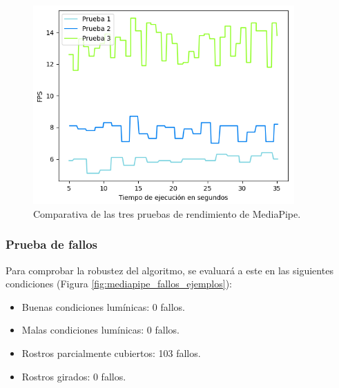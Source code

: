 \begin{figure} [h!]
  \begin{center}
    \includegraphics[width=10cm]{figs/mediapipe_rendimiento.png}
  \end{center}
  \captionsetup{justification=centering}
  \caption{Comparativa de las tres pruebas de rendimiento de MediaPipe.}
  \label{fig:mediapipe_rendimiento}
\end{figure}

\subsubsection{Prueba de fallos}

Para comprobar la robustez del algoritmo, se evaluará a este en las siguientes condiciones (Figura \ref{fig:mediapipe_fallos_ejemplos}):

\begin{itemize}
    \item Buenas condiciones lumínicas: 0 fallos.
    \item Malas condiciones lumínicas: 0 fallos.
    \item Rostros parcialmente cubiertos: 103 fallos.
    \item Rostros girados: 0 fallos.
\end{itemize}

